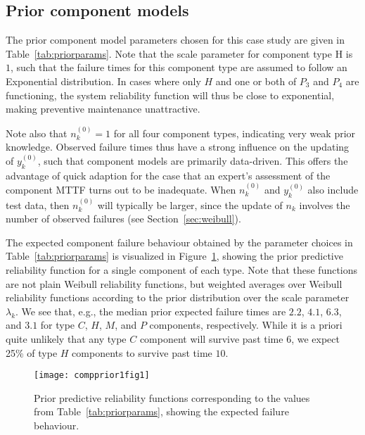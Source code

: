 \documentclass[authoryear]{elsarticle}
\newcommand{\uz}{^{(0)}} %
\def\ykz{y\uz_k}
\def\nkz{n\uz_k}
\begin{document}
\subsection{Prior component models}
\label{sec:ex-prior}

The prior component model parameters chosen for this case study
are given in Table~\ref{tab:priorparams}.
Note that the scale parameter for component type H is $1$,
such that the failure times for this component type are assumed to follow an Exponential distribution.
In cases where only $H$ and one or both of $P_3$ and $P_4$ are functioning,
the system reliability function will thus be close to exponential,
making preventive maintenance unattractive.

Note also that $\nkz = 1$ for all four component types,
indicating very weak prior knowledge.
Observed failure times thus have a strong influence on the updating of $\ykz$,
such that component models are primarily data-driven.
This offers the advantage of quick adaption
for the case that an expert's assessment of the component MTTF turns out to be inadequate.
When $\nkz$ and $\ykz$ also include test data,
then $\nkz$ will typically be larger,
since the update of $n_k$ involves the number of observed failures
(see Section~\ref{sec:weibull}).

The expected component failure behaviour obtained by the parameter choices in Table~\ref{tab:priorparams}
is visualized in Figure~\ref{fig:compprior1fig1},
showing the prior predictive reliability function for a single component of each type.
Note that these functions are not plain Weibull reliability functions,
but weighted averages over Weibull reliability functions according to the prior distribution over the scale parameter $\lambda_k$.
We see that, e.g., the median prior expected failure times are
$2.2$, $4.1$, $6.3$, and $3.1$ for type $C$, $H$, $M$, and $P$ components, respectively.
While it is a priori quite unlikely that any type $C$ component will survive past time $6$,
we expect 25\% of type $H$ components to survive past time $10$.

\begin{figure}
\centering
\texttt{[image: compprior1fig1]}
\caption{Prior predictive reliability functions corresponding to the values from Table~\ref{tab:priorparams},
showing the expected failure behaviour.}
\label{fig:compprior1fig1}
\end{figure}
\end{document}
